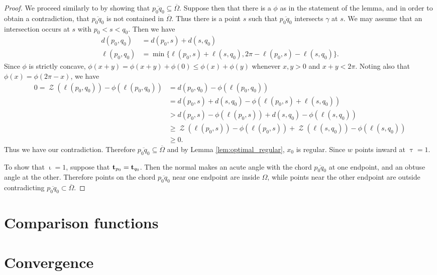 \documentclass[11pt]{amsart}
\DeclareMathOperator{\chordarcprofile}{\mathcal{Z}}
\DeclareMathOperator{\tangindicator}{\iota}
\DeclareMathOperator{\norindicator}{\tau}
\begin{document}
\begin{proof}
We proceed similarly to \cite{MR2794630} by showing that $\overline{p_0q_0} \subseteq \overline{\Omega}$. Suppose then that there is a $\phi$ as in the statement of the lemma, and in order to obtain a contradiction, that $\overline{p_0q_0}$ is not contained in $\overline{\Omega}$. Thus there is a point $s$ such that $\overline{p_0q_0}$ intersects $\gamma$ at $s$. We may assume that an intersection occurs at $s$ with $p_0 < s < q_0$. Then we have
\begin{align*}
d(p_0, q_0) &= d(p_0, s) + d(s, q_0) \\
\ell(p_0, q_0) &= \min\{\ell(p_0, s) + \ell(s, q_0),  2\pi -\ell(p_0,s ) - \ell(s, q_0)\}.
\end{align*}
Since $\phi$ is strictly concave, $\phi(x + y) = \phi(x + y) + \phi(0) \leq \phi(x) + \phi(y)$ whenever $x, y > 0$ and $x + y < 2\pi$. Noting also that $\phi(x) = \phi(2\pi - x)$, we have
\[
\begin{split}
0 = \chordarcprofile(\ell(p_0, q_0)) - \phi(\ell(p_0, q_0)) &=  d(p_0, q_0) - \phi(\ell(p_0, q_0)) \\
&= d(p_0, s) + d(s, q_0) - \phi(\ell(p_0, s) + \ell(s,  q_0)) \\
&> d(p_0, s) - \phi(\ell(p_0, s)) + d(s, q_0) - \phi(\ell(s, q_0)) \\
&\geq \chordarcprofile(\ell(p_0, s)) - \phi(\ell(p_0, s)) + \chordarcprofile(\ell(s, q_0)) - \phi(\ell(s, q_0)) \\
&\geq 0.
\end{split}
\]
Thus we have our contradiction. Therefore $\overline{p_0q_0} \subseteq \overline{\Omega}$ and by Lemma \ref{lem:optimal_regular}, \(x_0\) is regular. Since $w$ points inward at $\norindicator = 1$.

To show that $\tangindicator = 1$, suppose that $\operatorname{\mathbf{t}}_{p_0} = \operatorname{\mathbf{t}}_{q_0}$. Then the normal makes an acute angle with the chord $\overline{p_0 q_0}$ at one endpoint, and an obtuse angle at the other. Therefore points on the chord $\overline{p_0q_0}$ near one endpoint are inside $\Omega$, while points near the other endpoint are outside contradicting $\overline{p_0q_0} \subset \overline{\Omega}$.
\end{proof}

\section{Comparison functions}
\label{sec:orgheadline11}
\section{Convergence}
\label{sec:orgheadline12}
\end{document}
